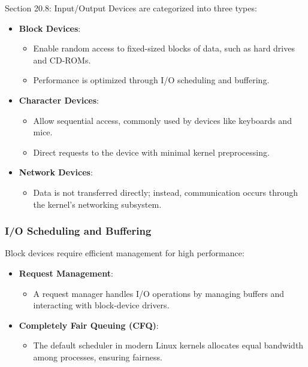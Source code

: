 \begin{notes}{Section 20.8: Input/Output}
    Devices are categorized into three types:
    \begin{itemize}
        \item \textbf{Block Devices}:
        \begin{itemize}
            \item Enable random access to fixed-sized blocks of data, such as hard drives and CD-ROMs.
            \item Performance is optimized through I/O scheduling and buffering.
        \end{itemize}
        \item \textbf{Character Devices}:
        \begin{itemize}
            \item Allow sequential access, commonly used by devices like keyboards and mice.
            \item Direct requests to the device with minimal kernel preprocessing.
        \end{itemize}
        \item \textbf{Network Devices}:
        \begin{itemize}
            \item Data is not transferred directly; instead, communication occurs through the kernel's networking subsystem.
        \end{itemize}
    \end{itemize}
    
    \subsubsection*{I/O Scheduling and Buffering}
    
    Block devices require efficient management for high performance:
    \begin{itemize}
        \item \textbf{Request Management}:
        \begin{itemize}
            \item A request manager handles I/O operations by managing buffers and interacting with block-device drivers.
        \end{itemize}
        \item \textbf{Completely Fair Queuing (CFQ)}:
        \begin{itemize}
            \item The default scheduler in modern Linux kernels allocates equal bandwidth among processes, ensuring fairness.
        \end{itemize}
    \end{itemize}
    

\end{notes}
